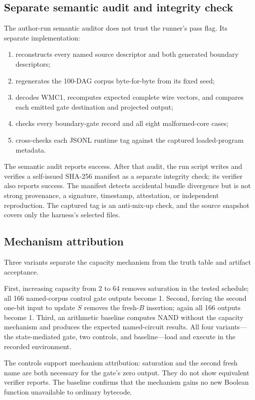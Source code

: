 \documentclass[conference]{IEEEtran}
\begin{document}
\subsection{Separate semantic audit and integrity check}

The author-run semantic auditor does not trust the runner's pass flag. Its separate implementation:

\begin{enumerate}
\item reconstructs every named source descriptor and both generated boundary descriptors;
\item regenerates the 100-DAG corpus byte-for-byte from its fixed seed;
\item decodes WMC1, recomputes expected complete wire vectors, and compares each emitted gate destination and projected output;
\item checks every boundary-gate record and all eight malformed-core cases;
\item cross-checks each JSONL runtime tag against the captured loaded-program metadata.
\end{enumerate}

The semantic audit reports success. After that audit, the run script writes and verifies a self-issued SHA-256 manifest as a separate integrity check; its verifier also reports success. The manifest detects accidental bundle divergence but is not strong provenance, a signature, timestamp, attestation, or independent reproduction. The captured tag is an anti-mix-up check, and the source snapshot covers only the harness's selected files.

\subsection{Mechanism attribution}

Three variants separate the capacity mechanism from the truth table and artifact acceptance.

First, increasing capacity from 2 to 64 removes saturation in the tested schedule; all 166 named-corpus control gate outputs become 1. Second, forcing the second one-bit input to update $S$ removes the fresh-$B$ insertion; again all 166 outputs become 1. Third, an arithmetic baseline computes NAND without the capacity mechanism and produces the expected named-circuit results. All four variants---the state-mediated gate, two controls, and baseline---load and execute in the recorded environment.

The controls support mechanism attribution: saturation and the second fresh name are both necessary for the gate's zero output. They do not show equivalent verifier reports. The baseline confirms that the mechanism gains no new Boolean function unavailable to ordinary bytecode.
\end{document}
